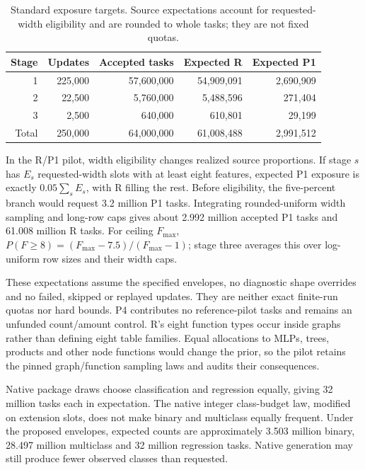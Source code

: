 \documentclass[11pt]{article}
\begin{document}
\begin{table}[ht]
\centering\small
\begin{tabular}{@{}rrrrr@{}}
\toprule Stage & Updates & Accepted tasks & Expected R & Expected P1\\
\midrule
1 & 225,000 & 57,600,000 & 54,909,091 & 2,690,909\\
2 & 22,500 & 5,760,000 & 5,488,596 & 271,404\\
3 & 2,500 & 640,000 & 610,801 & 29,199\\
\midrule Total & 250,000 & 64,000,000 & 61,008,488 & 2,991,512\\
\bottomrule
\end{tabular}
\caption{Standard exposure targets. Source expectations account for requested-width eligibility and are rounded to whole tasks; they are not fixed quotas.}
\end{table}

In the R/P1 pilot, width eligibility changes realized source proportions. If stage $s$ has $E_s$ requested-width slots with at least eight features, expected P1 exposure is exactly $0.05\sum_s E_s$, with R filling the rest. Before eligibility, the five-percent branch would request 3.2 million P1 tasks. Integrating rounded-uniform width sampling and long-row caps gives about 2.992 million accepted P1 tasks and 61.008 million R tasks. For ceiling $F_{\max}$, $P(F\geq8)=(F_{\max}-7.5)/(F_{\max}-1)$; stage three averages this over log-uniform row sizes and their width caps.

These expectations assume the specified envelopes, no diagnostic shape overrides and no failed, skipped or replayed updates. They are neither exact finite-run quotas nor hard bounds. P4 contributes no reference-pilot tasks and remains an unfunded count/amount control. R's eight function types occur inside graphs rather than defining eight table families. Equal allocations to MLPs, trees, products and other node functions would change the prior, so the pilot retains the pinned graph/function sampling laws and audits their consequences.

Native package draws choose classification and regression equally, giving 32 million tasks each in expectation. The native integer class-budget law, modified on extension slots, does not make binary and multiclass equally frequent. Under the proposed envelopes, expected counts are approximately 3.503 million binary, 28.497 million multiclass and 32 million regression tasks. Native generation may still produce fewer observed classes than requested.
\end{document}
